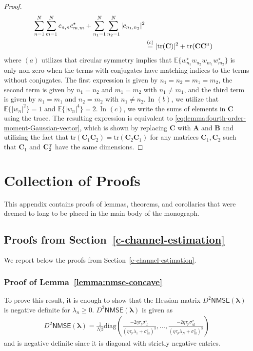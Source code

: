\documentclass[SIG,biber]{nowfnt}
\newcommand{\mathacr}[1]{\mathsf{#1}}
\newcommand{\vect}[1]{\mathbf{#1}}
\def\diag{\mathrm{diag}}
\def\tr{\mathrm{tr}}
\def\Htran{\mbox{\tiny $\mathrm{H}$}}
\def\Ttran{\mbox{\tiny $\mathrm{T}$}}
\def\sigmaUL{\sigma^2_{\mathrm{ul}}}
\begin{document}
\begin{proof}
\begin{align}
\sum_{n=1}^{N}
\sum_{m=1}^{N}
 c_{n,n} c_{m,m}^{\star} +
\sum_{n_1=1}^{N}
\sum_{n_2=1}^{N}  |c_{n_1,n_2}|^2
\notag \\ & \overset{(c)}{=} |\tr(\vect{C})|^2 + \tr(\vect{C} \vect{C}^{\Htran})
\end{align}
where $(a)$ utilizes that circular symmetry implies that $\mathbb{E}\{
w_{n_1}^{\star} w_{n_2}w_{m_1} w_{m_2}^{\star} \}$ is only non-zero when the terms with conjugates have matching indices to the terms without conjugates. The first expression is given by $n_1 = n_2 = m_1 = m_2$, the second term is given by $n_1 = n_2$ and $m_1 = m_2$ with $n_1 \neq m_1$, and the third term is given by $n_1 = m_1$ and $n_2 = m_2$ with $n_1 \neq n_2$.
In $(b)$, we utilize that $\mathbb{E}\{ |w_{n}|^2  \} = 1$ and $\mathbb{E}\{ |w_{n}|^4  \} = 2$.
In $(c)$, we write the sums of elements in $\vect{C}$ using the trace. The resulting expression is equivalent to  \eqref{eq:lemma:fourth-order-moment-Gaussian-vector}, which is shown by replacing $\vect{C}$ with $\vect{A}$ and $\vect{B}$ and utilizing the fact that $\tr( \vect{C}_1 \vect{C}_2 ) = \tr(  \vect{C}_2 \vect{C}_1 )$ for any matrices $\vect{C}_1, \vect{C}_2$ such that  $\vect{C}_1$ and  $\vect{C}_2^{\Ttran}$ have the same dimensions.
\end{proof}



\chapter{Collection of Proofs}\label{appendix2}
\vspace*{-1.8in}


This appendix contains proofs of lemmas, theorems, and corollaries that were deemed to long to be placed in the main body of the monograph.

\vspace{-3mm}

\section{Proofs from Section~\ref{c-channel-estimation}}
We report below the proofs from Section~\ref{c-channel-estimation}. 
\subsection{Proof of Lemma~\ref{lemma:nmse-concave}}\label{proof-of-lemma:nmse-concave}
To prove this result, it is enough to show that the Hessian matrix $D^2\mathacr{NMSE}\left(\boldsymbol{\lambda}\right)$ is negative definite for $\lambda_n\geq 0$. $D^2\mathacr{NMSE}\left(\boldsymbol{\lambda}\right)$ is given as
	\begin{align}
	\!\!\!\!D^2\mathacr{NMSE}\left(\boldsymbol{\lambda}\right)=\frac{1}{N\beta}\diag \left( \frac{-2\eta\tau_p\sigmaUL}{\left(\eta\tau_p\lambda_1+\sigmaUL\right)^3}, \ldots, \frac{-2\eta\tau_p\sigmaUL}{\left(\eta\tau_p\lambda_N+\sigmaUL\right)^3} \right)
	\end{align}
	and is negative definite since it is diagonal with strictly negative entries.
	\vspace{-3mm}
	
\end{document}
